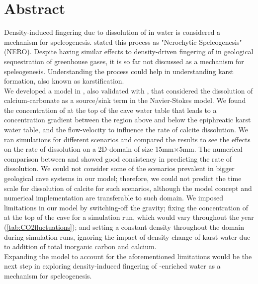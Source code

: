 \chapter*{Abstract}
\thispagestyle{empty}
Density-induced fingering due to dissolution of  in water is considered a mechanism for 
speleogenesis. \citet{Scherzer2017} stated this process as "Nerochytic Speleogenesis" (NERO). 
Despite having similar effects to density-driven fingering of  in geological sequestration 
of greenhouse gases, it is so far not discussed as a mechanism for speleogenesis. Understanding the 
process could help in understanding karst formation, also known as karstification.\\

We developed a model in \DuMuX, also validated with \MATLAB, that considered the dissolution of calcium-carbonate 
as a source/sink term in the Navier-Stokes model. We found the concentration of  at the top of 
the cave water table that leads to a concentration gradient between the region above and below the epiphreatic karst water table, 
and the flow-velocity to influence the rate of calcite dissolution. We ran simulations for different 
scenarios and compared the results to see the effects on the rate of dissolution on a 2D-domain of  size 15mm$\times$5mm. 
The numerical comparison between \DuMuX and \MATLAB showed good consistency in predicting the rate of dissolution. 
We could not consider some of the scenarios prevalent in bigger geological cave systems in our model; therefore, we could not 
predict the time scale for dissolution of calcite for such scenarios, although the model concept and numerical 
implementation are transferable to such domain. We imposed limitations in our model by switching-off the 
gravity; fixing the concentration of  at the top of the cave for a simulation run, which would vary throughout the year (\cref{tab:CO2fluctuations}); and 
setting a constant density throughout the domain during simulation runs, ignoring the impact of density change of karst 
water due to addition of total inorganic carbon and calcium.\\

Expanding the model to account for the aforementioned limitations would be the next step in exploring density-induced 
fingering of -enriched water as a mechanism for speleogenesis.

\endinput